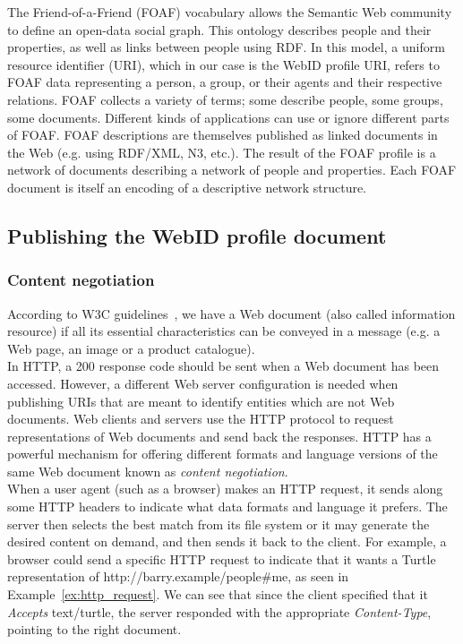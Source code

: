 The Friend-of-a-Friend (FOAF) vocabulary allows the Semantic Web community to define an open-data social graph. This ontology describes people and their properties, as well as links between people using RDF. In this model, a uniform resource identifier (URI), which in our case is the WebID profile URI, refers to FOAF data representing a person, a group, or their agents and their respective relations. FOAF collects a variety of terms; some describe people, some groups, some documents. Different kinds of applications can use or ignore different parts of FOAF. FOAF descriptions are themselves published as linked documents in the Web (e.g. using RDF/XML, N3, etc.). The result of the FOAF profile is a network of documents describing a network of people and properties. Each FOAF document is itself an encoding of a descriptive network structure.\\

\subsection{Publishing the WebID profile document}
\label{subsec:publishing_webid}
\subsubsection{Content negotiation}
According to W3C guidelines~\cite{jacobs2004architecture}, we have a Web document (also called information resource) if all its essential characteristics can be conveyed in a message (e.g. a Web page, an image or a product catalogue).\\

In HTTP, a 200 response code should be sent when a Web document has been accessed. However, a different Web server configuration is needed when publishing URIs that are meant to identify entities which are not Web documents. Web clients and servers use the HTTP protocol to request representations of Web documents and send back the responses. HTTP has a powerful mechanism for offering different formats and language versions of the same Web document known as \textit{content negotiation}.\\

When a user agent (such as a browser) makes an HTTP request, it sends along some HTTP headers to indicate what data formats and language it prefers. The server then selects the best match from its file system or it may generate the desired content on demand, and then sends it back to the client. For example, a browser could send a specific HTTP request to indicate that it wants a Turtle representation of http://barry.example/people\#me, as seen in Example~\ref{ex:http_request}. We can see that since the client specified that it \textit{Accepts} text/turtle, the server responded with the appropriate \textit{Content-Type}, pointing to the right document.

